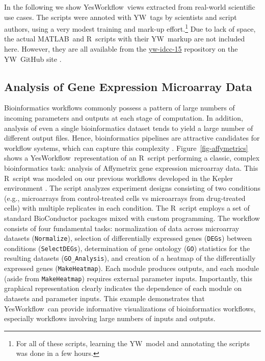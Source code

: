 \documentclass[15]{ijdc-v9}
\newcommand{\YW}{\textsf{YesWorkflow}}
\newcommand{\yw}{\textsf{YW}}
\newcommand{\ywm}[1]{\texttt{\small #1}}
\newcommand{\R}{R}
\newcommand{\MATLAB}{MATLAB}
\newcommand{\figref}[1]{Figure~\ref{#1}}
\begin{document}
 In the following we show \YW\ views extracted from real-world
 scientific use cases.  The scripts were annoted with \yw\ tags by
 scientists and script authors, using a very modest training and
 mark-up effort.\footnote{For all of these scripts, learning the \yw\
   model and annotating the scripts was done in a few hours.}  Due to
 lack of space, the actual \MATLAB\ and \R\ scripts with their \yw\
 markup are not included here. However, they are all available from
 the  \href{http://yesworkflow.org/yw-idcc-15}{yw-idcc-15} repository 
on the \yw\ GitHub site \cite{YWgithub2015}.

\subsection{Analysis of Gene Expression Microarray Data}

 Bioinformatics workflows commonly possess a pattern of large numbers
 of incoming parameters and outputs at each stage of computation. In
 addition, analysis of even a single bioinformatics dataset tends to
 yield a large number of different output files. Hence, bioinformatics
 pipelines are attractive candidates for workflow systems, which can
 capture this complexity \cite{bieda2012kepler}. \figref{fig-affymetrics}
 shows a \YW\ representation of an \R\ script performing a
 classic, complex bioinformatics task: analysis of Affymetrix gene
 expression microarray data. This \R\ script was modeled on our previous
 workflows developed in the Kepler environment \cite{stropp2012workflows}.
 The script analyzes experiment designs consisting of two conditions
 (e.g., microarrays from control-treated cells vs microarrays from
 drug-treated cells) with multiple replicates in each condition. The
 \R\ script employs a set of standard BioConductor
 \cite{gentleman2004bioconductor} packages mixed with custom programming. The
 workflow consists of four fundamental tasks: normalization of data
 across microarray datasets (\ywm{Normalize}), selection of
 differentially expressed genes (\ywm{DEGs}) between conditions
 (\ywm{SelectDEGs}), determination of gene ontology (\ywm{GO})
 statistics for the resulting datasets (\ywm{GO\_Analysis}), and
 creation of a heatmap of the differentially expressed genes
 (\ywm{MakeHeatmap}). Each module produces outputs, and each module
 (aside from \ywm{MakeHeatmap}) requires external parameter
 inputs. Importantly, this graphical representation clearly indicates
 the dependence of each module on datasets and parameter inputs. This
 example demonstrates that \YW\ can provide informative visualizations
 of bioinformatics workflows, especially workflows involving large
 numbers of inputs and outputs.
\end{document}
